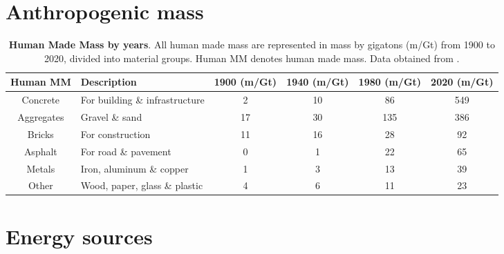 \section[Anthropogenic mass]{Anthropogenic mass}
\label{sec:anthropogenic_mass}

\begin{table}[!htb]
  \caption[Human Made Mass by years]{\textbf{Human Made Mass by years}. All human made mass are represented in mass by gigatons (m/Gt) from 1900 to 2020, divided into material groups. Human MM denotes human made mass. Data obtained from .\autocite{krausmann2017global}}
  \begin{scriptsize}
    \begin{tabulary}{0.65\linewidth}{clcccc}
      \textbf{Human MM} & \textbf{Description} & \textbf{1900 (m/Gt)} & \textbf{1940 (m/Gt)} & \textbf{1980 (m/Gt)} & \textbf{2020 (m/Gt)} \\ \hline
      Concrete & For building \& infrastructure & 2 & 10 & 86 & 549  \\
      Aggregates & Gravel \& sand & 17 & 30 & 135 & 386  \\
      Bricks & For construction & 11 & 16 & 28 & 92  \\
      Asphalt & For road \& pavement & 0 & 1 & 22 & 65  \\
      Metals & Iron, aluminum \& copper & 1 & 3 & 13 & 39  \\
      Other & Wood, paper, glass \& plastic & 4 & 6 & 11 & 23  \\
    \end{tabulary}
  \end{scriptsize}
  \label{tab:hmm_table}
\end{table}

\section[Energy sources]{Energy sources}
\label{sec:energy_sources}



